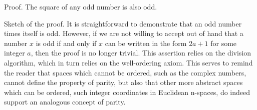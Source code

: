 \documentclass[letterpaper,twoside,10pt]{article}
\begin{document}
Proof. The square of any odd number is also odd. 
\vspace{.5cm}

Sketch of the proof. It is straightforward to demonstrate that an odd number times itself is odd. However, if we are not willing to accept out of hand that a number $x$ is odd if and only if $x$ can be written in the form $2a+1$ for some integer $a$, then the proof is no longer trivial. This assertion relies on the division algorithm, which in turn relies on the well-ordering axiom. This serves to remind the reader that spaces which cannot be ordered, such as the complex numbers, cannot define the property of parity, but also that other more abstract spaces which can be ordered, such integer coordinates in Euclidean n-spaces, do indeed support an analogous concept of parity.
\end{document}
